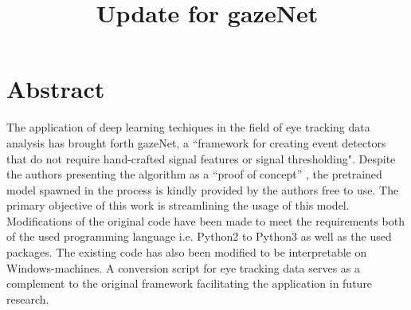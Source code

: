 \documentclass[conference]{IEEEtran}
\begin{document}
\title{Update for gazeNet\\
}

\author{
\and
{}
\and
{}
}

\maketitle
\section{Abstract}
The application of deep learning techiques in the field of eye tracking data analysis has brought forth gazeNet, a ``framework for creating event detectors that do not require hand-crafted signal
features or signal thresholding". \citet{zemblys2018gazeNet} Despite the authors presenting the algorithm as a ``proof of concept'' \citet{zemblys2018gazeNet}, the pretrained model spawned in the process is kindly provided by the authors free to use. The primary objective of this work is streamlining the usage of this model. Modifications of the original code have been made to meet the requirements both of the used programming language i.e. Python2 to Python3 as well as the used packages. The existing code has also been modified to be interpretable on Windows-machines. A conversion script for eye tracking data serves as a complement to the original framework facilitating the application in future research.
\end{document}
